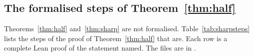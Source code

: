 \subsection{The formalised steps of Theorem~\ref{thm:half}}\label{app:sharpsteps}

Theorems~\ref{thm:half} and~\ref{thm:sharp} are not formalised. Table~\ref{tab:sharpsteps} lists
the steps of the proof of Theorem~\ref{thm:half} that are. Each row is a complete Lean proof of
the statement named. The files are in .


